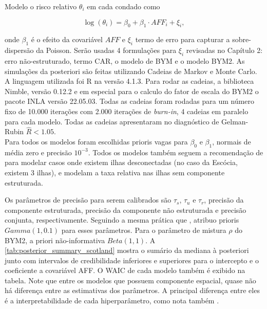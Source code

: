 \begin{figure}[b]
\begin{minipage}{.45\textwidth}
  \label{fig:AFF Lip cancer}
\end{minipage}
\end{figure}


Modelo o risco relativo $\theta_i$ em cada condado como

\begin{equation}
    \log(\theta_i) = \beta_0 + \beta_1 \cdot AFF_i + \xi_i,
\end{equation}

onde $\beta_1$ é o efeito da covariável $AFF$ e $\xi_i$ termo de erro para capturar a sobre-dispersão da Poisson. Serão usadas 4 formulações para $\xi_i$ revisadas no Capítulo 2: erro não-estruturado, termo CAR, o modelo de BYM e o modelo BYM2. As simulações da posteriori são feitas utilizando Cadeias de Markov e Monte Carlo. A linguagem utilizada foi R na versão 4.1.3. Para rodar as cadeias, a biblioteca Nimble, versão 0.12.2 e em especial para o calculo do fator de escala do BYM2 o pacote INLA versão 22.05.03. Todas as cadeias foram rodadas para um número fixo de 10.000 iterações com 2.000 iterações de \textit{burn-in}, 4 cadeias em paralelo para cada modelo. Todas as cadeias apresentaram no diagnóstico de Gelman-Rubin  $\hat{R} < 1.05$.\\

Para todos os modelos foram escolhidas prioris vagas  para $\beta_0$ e $\beta_1$, normais de média zero e precisão $10^{-3}$. Todos os modelos também seguem a recomendação de \cite{Sterrantino2018} para modelar casos onde existem ilhas desconectadas (no caso da Escócia, existem 3 ilhas), e modelam a taxa relativa nas ilhas sem componente estruturada.

Os parâmetros de precisão para serem calibrados são $\tau_s$, $\tau_u$ e $\tau_r$, precisão da componente estruturada, precisão da componente não estruturada e precisão conjunta, respectivamente. Seguindo a mesma prática que \cite{Wakefield2007}, atribuo prioris $Gamma(1,0.1)$ para esses parâmetros. Para o parâmetro de mistura $\rho$ do BYM2, a priori não-informativa $Beta(1,1)$. A \autoref{tab:posterior_summary_scotland} mostra o sumário da mediana à posteriori junto com intervalos de credibilidade inferiores e superiores para o intercepto e o coeficiente a covariável AFF. O WAIC de cada modelo também é exibido na tabela. Note que entre os modelos que possuem componente espacial, quase não há diferença entre as estimativas dos parâmetros. A principal diferença entre eles é a interpretabilidade de cada hiperparâmetro, como nota também \cite{Ribler2019}. 

